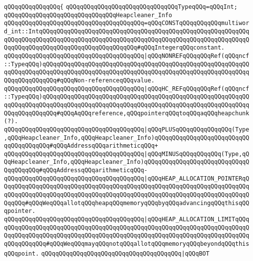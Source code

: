 \verb|qQQqqQQqqQQqqQQq{|\newline
\verb|qQQqqQQqqQQqqQQqqQQqqQQqqQQqqQQqTypeqQQq=qQQqInt;|\newline
\newline
\verb|qQQqqQQqqQQqqQQqqQQqqQQqqQQqqQQqHeapcleaner_Info|\newline
\verb|qQQqqQQqqQQqqQQqqQQqqQQqqQQqqQQqqQQqqQQq=qQQqCONSTqQQqqQQqqQQqmultiword_int::IntqQQqqQQqqQQqqQQqqQQqqQQqqQQqqQQqqQQqqQQqqQQqqQQqqQQqqQQqqQQqqQQqqQQqqQQqqQQqqQQqqQQqqQQqqQQqqQQqqQQqqQQqqQQqqQQqqQQqqQQqqQQqqQQqqQQqqQQqqQQqqQQqqQQqqQQqqQQqqQQqqQQqqQQq#qQQqIntegerqQQqconstant.|\newline
\verb|qQQqqQQqqQQqqQQqqQQqqQQqqQQqqQQqqQQqqQQq|\verb#|qQQqNONREFqQQqqQQqRef(qQQqncf::TypeqQQq)qQQqqQQqqQQqqQQqqQQqqQQqqQQqqQQqqQQqqQQqqQQqqQQqqQQqqQQqqQQqqQQqqQQqqQQqqQQqqQQqqQQqqQQqqQQqqQQqqQQqqQQqqQQqqQQqqQQqqQQqqQQqqQQqqQQqqQQqqQQqqQQq#\verb|#qQQqNon-referenceqQQqvalue.|\newline
\verb|qQQqqQQqqQQqqQQqqQQqqQQqqQQqqQQqqQQqqQQq|\verb#|qQQqHC_REFqQQqqQQqRef(qQQqncf::TypeqQQq)qQQqqQQqqQQqqQQqqQQqqQQqqQQqqQQqqQQqqQQqqQQqqQQqqQQqqQQqqQQqqQQqqQQqqQQqqQQqqQQqqQQqqQQqqQQqqQQqqQQqqQQqqQQqqQQqqQQqqQQqqQQqqQQqqQQqqQQqqQQqqQQq#\verb|#qQQqAqQQqreference,qQQqpointerqQQqtoqQQqaqQQqheapchunk(?).|\newline
\verb|qQQqqQQqqQQqqQQqqQQqqQQqqQQqqQQqqQQqqQQq|\verb#|qQQqPLUSqQQqqQQqqQQqqQQq(Type,qQQqHeapcleaner_Info,qQQqHeapcleaner_Info)qQQqqQQqqQQqqQQqqQQqqQQqqQQqqQQqqQQqqQQq#\verb|#qQQqAddressqQQqarithmeticqQQq+|\newline
\verb|qQQqqQQqqQQqqQQqqQQqqQQqqQQqqQQqqQQqqQQq|\verb#|qQQqMINUSqQQqqQQqqQQq(Type,qQQqHeapcleaner_Info,qQQqHeapcleaner_Info)qQQqqQQqqQQqqQQqqQQqqQQqqQQqqQQqqQQqqQQq#\verb|#qQQqAddressqQQqarithmeticqQQq-|\newline
\verb|qQQqqQQqqQQqqQQqqQQqqQQqqQQqqQQqqQQqqQQq|\verb#|qQQqHEAP_ALLOCATION_POINTERqQQqqQQqqQQqqQQqqQQqqQQqqQQqqQQqqQQqqQQqqQQqqQQqqQQqqQQqqQQqqQQqqQQqqQQqqQQqqQQqqQQqqQQqqQQqqQQqqQQqqQQqqQQqqQQqqQQqqQQqqQQqqQQqqQQqqQQqqQQqqQQqqQQq#\verb|#qQQqWeqQQqallotqQQqheapqQQqmemoryqQQqbyqQQqadvancingqQQqthisqQQqpointer.|\newline
\verb|qQQqqQQqqQQqqQQqqQQqqQQqqQQqqQQqqQQqqQQq|\verb#|qQQqHEAP_ALLOCATION_LIMITqQQqqQQqqQQqqQQqqQQqqQQqqQQqqQQqqQQqqQQqqQQqqQQqqQQqqQQqqQQqqQQqqQQqqQQqqQQqqQQqqQQqqQQqqQQqqQQqqQQqqQQqqQQqqQQqqQQqqQQqqQQqqQQqqQQqqQQqqQQqqQQqqQQqqQQqqQQq#\verb|#qQQqWeqQQqmayqQQqnotqQQqallotqQQqmemoryqQQqbeyondqQQqthisqQQqpoint.|\newline
\verb|qQQqqQQqqQQqqQQqqQQqqQQqqQQqqQQqqQQqqQQq|\verb#|qQQqBOT#\newline
